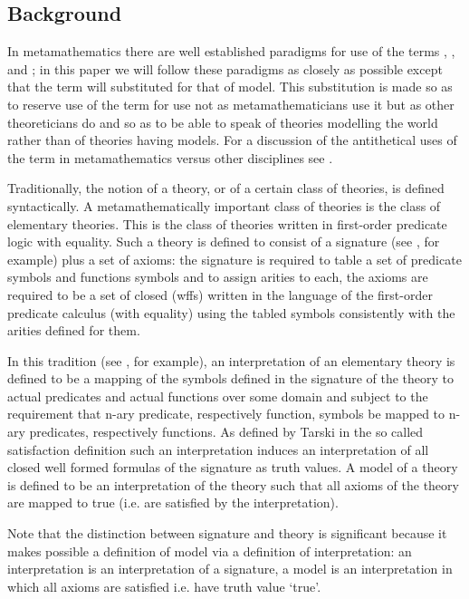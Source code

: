 \subsection{Background}
In metamathematics there are well established paradigms for use of the terms
, ,  and ;
in this paper  we will follow these paradigms as closely as possible except that the term  will substituted  for that of model. 
This substitution is made so as to reserve use of the term  for  use not as metamathematicians 
use it but as other theoreticians do and so as to be able to speak of theories modelling 
the world rather than of theories having models. For a discussion of the antithetical uses of the term 
 in metamathematics versus other disciplines see \cite{HodgesModelTheory}.

Traditionally, the notion of a theory, or of a certain class of theories, is  defined syntactically.
A metamathematically important class of theories  is the class of elementary theories. 
This is the class of theories written in first-order predicate logic with equality. 
Such a theory is defined to consist of a signature (see \cite{HodgesModelTheory}, for example) plus a set of axioms: 
the signature is required to table a set of predicate symbols and functions symbols and to assign arities to each, 
the axioms are required  to be a set of closed  (wffs) written
in the language of the first-order predicate calculus (with equality)
using the tabled  symbols  consistently with the arities defined for them. 

In this tradition (see \cite{Mendelson}, for example), an interpretation of an elementary theory is defined to be 
a mapping of the symbols defined in the signature  of the theory 
to actual predicates and actual functions over some domain 
and subject to the requirement that n-ary predicate, respectively function, symbols be mapped to n-ary predicates, respectively functions.
As defined by Tarski in the so called satisfaction definition
such an interpretation induces an interpretation of all
closed well formed formulas of the signature as truth values. 
A model of a theory is defined to be an interpretation of the theory such that all axioms of the theory are mapped to true (i.e. are satisfied by the interpretation). 

Note that the distinction between signature and theory is significant because it makes possible a definition of model 
via a definition of interpretation: an interpretation is an interpretation of a signature, 
a model is an interpretation in which all axioms are satisfied i.e. have truth value `true'.   

